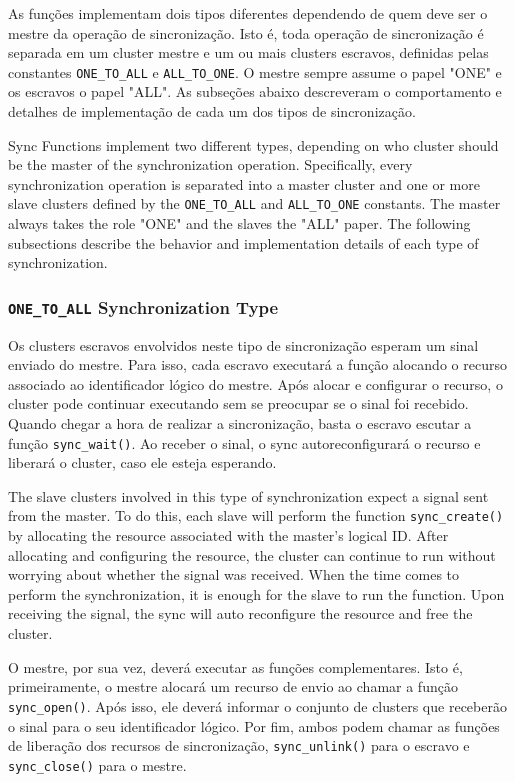 		As funções implementam dois tipos diferentes dependendo de quem
		deve ser o mestre da operação de sincronização.
		Isto é, toda operação de sincronização é separada em um cluster mestre
		e um ou mais clusters escravos, definidas pelas constantes
		\texttt{ONE\_TO\_ALL} e \texttt{ALL\_TO\_ONE}.
		O mestre sempre assume o papel "ONE" e os escravos o papel "ALL".
		As subseções abaixo descreveram o comportamento e detalhes de implementação
		de cada um dos tipos de sincronização.

		Sync Functions implement two different types, depending on who cluster
		should be the master of the synchronization operation.
		Specifically, every synchronization operation is separated into a
		master cluster and one or more slave clusters defined by the
		\texttt{ONE\_TO\_ALL} and \texttt{ALL\_TO\_ONE} constants.
		The master always takes the role "ONE" and the slaves the "ALL" paper.
		The following subsections describe the behavior and implementation
		details of each type of synchronization.

			\subsubsection*{\texttt{ONE\_TO\_ALL} Synchronization Type}

				Os clusters escravos envolvidos neste tipo de sincronização esperam
				um sinal enviado do mestre.
				Para isso, cada escravo executará a função 
				alocando o recurso associado ao identificador lógico do mestre.
				Após alocar e configurar o recurso, o cluster pode continuar
				executando sem se preocupar se o sinal foi recebido.
				Quando chegar a hora de realizar a sincronização, basta o escravo
				escutar a função \texttt{sync\_wait()}.
				Ao receber o sinal, o sync autoreconfigurará o recurso e liberará o cluster,
				caso ele esteja esperando.

				The slave clusters involved in this type of synchronization expect
				a signal sent from the master.
				To do this, each slave will perform the function \texttt{sync\_create()}
				by allocating the resource associated with the master's logical ID.
				After allocating and configuring the resource, the cluster can
				continue to run without worrying about whether the signal was received.
				When the time comes to perform the synchronization, it is enough for
				the slave to run the function.
				Upon receiving the signal, the sync will auto reconfigure the resource
				and free the cluster.

				O mestre, por sua vez, deverá executar as funções complementares.
				Isto é, primeiramente, o mestre alocará um recurso de envio
				ao chamar a função \texttt{sync\_open()}.
				Após isso, ele deverá informar o conjunto de clusters que
				receberão o sinal para o seu identificador lógico.
				Por fim, ambos podem chamar as funções de liberação dos recursos
				de sincronização, \texttt{sync\_unlink()} para o escravo e
				\texttt{sync\_close()} para o mestre.

